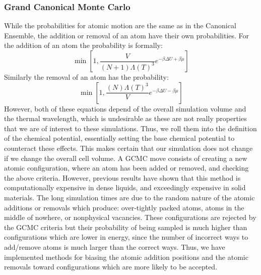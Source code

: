 \subsubsection{Grand Canonical Monte Carlo}
While the probabilities for atomic motion are the same as in the Canonical Ensemble, the addition or removal of an atom have their own probabilities. For the addition of an atom the probability is formally:
\begin{equation}
  \min[1, \frac{V}{(N+1) \Lambda(T)^{3}}e^{-\beta\Delta U + \beta \mu}]
\end{equation}
Similarly the removal of an atom has the probability:
\begin{equation}
  \min[1, \frac{(N)\Lambda(T)^{3}}{V}e^{-\beta\Delta U - \beta \mu}]
\end{equation}
However, both of these equations depend of the overall simulation volume and the thermal wavelength, which is undesirable as these are not really properties that we are of interest to these simulations.
Thus, we roll them into the definition of the chemical potential, essentially setting the base chemical potential to counteract these effects.
This makes certain that our simulation does not change if we change the overall cell volume.
A GCMC move consists of creating a new atomic configuration, where an atom has been added or removed, and checking the above criteria.
However, previous results have shown that this method is computationally expensive in dense liquids, and exceedingly expensive in solid materials.
The long simulation times are due to the random nature of the atomic additions or removals which produce: over-tightly packed atoms, atoms in the middle of nowhere, or nonphysical vacancies.
These configurations are rejected by the GCMC criteria but their probability of being sampled is much higher than configurations which are lower in energy, since the number of incorrect ways to add/remove atoms is much larger than the correct ways.
Thus, we have implemented methods for biasing the atomic addition positions and the atomic removals toward configurations which are more likely to be accepted.

